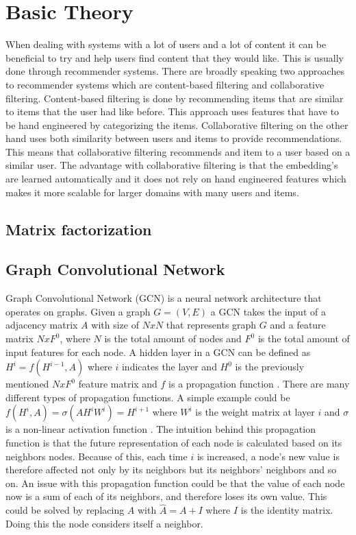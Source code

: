 \section{Basic Theory}
When dealing with systems with a lot of users and a lot of content it can be beneficial to try and help users find content that they would like.
This is usually done through recommender systems.
There are broadly speaking two approaches to recommender systems which are content-based filtering and collaborative filtering.
Content-based filtering is done by recommending items that are similar to items that the user had like before.
This approach uses features that have to be hand engineered by categorizing the items.
Collaborative filtering on the other hand uses both similarity between users and items to provide recommendations. 
This means that collaborative filtering recommends and item to a user based on a similar user.
The advantage with collaborative filtering is that the embedding's are learned automatically and it does not rely on hand engineered features which makes it more scalable for larger domains with many users and items. 

\subsection{Matrix factorization}


\subsection{Graph Convolutional Network}
Graph Convolutional Network (GCN) is a neural network architecture that operates on graphs.
Given a graph $G = (V,E)$ a GCN takes the input of a adjacency
matrix $A$ with size of $N x N$ that represents graph $G$ and a feature matrix $N x F^0$, where $N$ is the total amount of nodes and $F^0$ is the total amount of input features for each node.
A hidden layer in a GCN can be defined as $H^i = f(H^{i-1}, A)$ where $i$ indicates the layer and $H^0$ is the previously mentioned $N x F^0$ feature matrix and $f$ is a propagation function \cite{Deep-Learning-on-Graphs-with-GCN}.
There are many different types of propagation functions.
A simple example could be $f(H^i, A) = \sigma(AH^iW^i) = H^{i+1}$ where $W^i$ is the weight matrix at layer $i$ and $\sigma$ is a non-linear activation function \cite{Deep-Learning-on-Graphs-with-GCN}.
The intuition behind this propagation function is that the future representation of each node is calculated based on its neighbors nodes.
Because of this, each time $i$ is increased, a node's new value is therefore affected not only by its neighbors but its neighbors' neighbors and so on.
An issue with this propagation function could be that the value of each node now is a sum of each of its neighbors, and therefore loses its own value.
This could be solved by replacing $A$ with $\hat{A} = A + I$ where $I$ is the identity matrix.
Doing this the node considers itself a neighbor.
